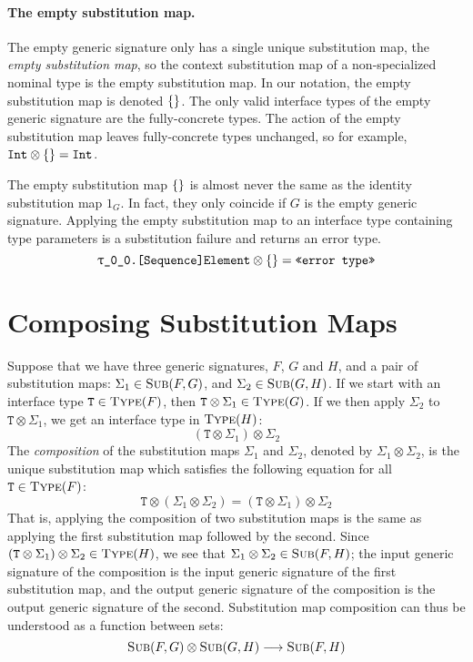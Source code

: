 \documentclass[../generics]{subfiles}
\begin{document}
\paragraph{The empty substitution map.}
The empty generic signature only has a single unique substitution map, the \emph{empty substitution map}, so the context substitution map of a non-specialized nominal type is the empty substitution map. In our notation, the empty substitution map is denoted $\{\}$. The only valid interface types of the empty generic signature are the fully-concrete types. The action of the empty substitution map leaves fully-concrete types unchanged, so for example, $\texttt{Int}\otimes\{\} = \texttt{Int}$.

The empty substitution map $\{\}$ is almost never the same as the identity substitution map $1_G$. In fact, they only coincide if $G$ is the empty generic signature. Applying the empty substitution map to an interface type containing type parameters is a substitution failure and returns an error type.
\[\texttt{\texttt{$\uptau$\_0\_0}.[Sequence]Element} \otimes \{\} = \texttt{<<error type>>}\]

\section{Composing Substitution Maps}\label{submapcomposition}

Suppose that we have three generic signatures, $F$, $G$ and $H$, and a pair of substitution maps: $\Sigma_1\in\textsc{Sub}({F, G})$, and $\Sigma_2\in\textsc{Sub}({G, H})$. If we start with an interface type $\texttt{T}\in\textsc{Type}({F})$, then $\texttt{T}\otimes\Sigma_1\in\textsc{Type}({G})$. If we then apply $\Sigma_2$ to $\texttt{T}\otimes\Sigma_1$, we get an interface type in $\textsc{Type}({H})$:
\[(\texttt{T}\otimes\Sigma_1)\otimes\Sigma_2\]
The \emph{composition} of the substitution maps $\Sigma_1$ and $\Sigma_2$, denoted by \index{$\otimes$}$\Sigma_1\otimes\Sigma_2$, is the unique substitution map which satisfies the following equation for all $\texttt{T}\in\textsc{Type}({F})$:
\[\texttt{T}\otimes(\Sigma_1\otimes\Sigma_2)=(\texttt{T}\otimes\Sigma_1)\otimes\Sigma_2\]
That is, applying the composition of two substitution maps is the same as applying the first substitution map followed by the second. Since $(\texttt{T}\otimes\Sigma_1)\otimes\Sigma_2\in\textsc{Type}({H})$, we see that $\Sigma_1\otimes\Sigma_2\in\textsc{Sub}({F, H})$; the input generic signature of the composition is the input generic signature of the first substitution map, and the output generic signature of the composition is the output generic signature of the second. Substitution map composition can thus be understood as a function between sets:
\[\textsc{Sub}({F, G})\otimes\textsc{Sub}({G, H})\longrightarrow\textsc{Sub}({F, H})\]
\end{document}
